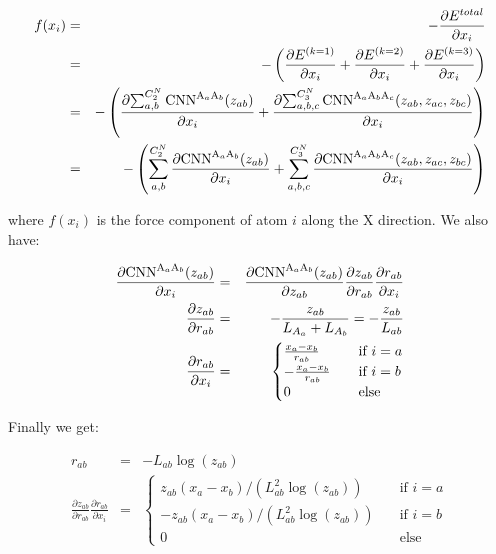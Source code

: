 \documentclass{article}
\begin{document}
\begin{eqnarray}
f(x_{i}) & = & -\frac{\partial{E^{total}}}{\partial{x_{i}}} \nonumber \\
& = & -\left(
	\frac{\partial{E^{(k=1)}}}{\partial{x_i}} 
	+ \frac{\partial{E^{(k=2)}}}{\partial{x_i}}
	+ \frac{\partial{E^{(k=3)}}}{\partial{x_i}} 
\right) \nonumber \\
& = & -\left(
\frac{
	\partial{\sum_{a,b}^{C^N_2}{
		\boldmath{\mathrm{CNN}}^{\mathrm{A}_{a}\mathrm{A}_{b}}}(z_{ab})}
	}{
		\partial{x_i}
	} 
+ 
\frac{
	\partial{\sum_{a,b,c}^{C^N_3}{
		\boldmath{\mathrm{CNN}}^{\mathrm{A}_{a}\mathrm{A}_{b}\mathrm{A}_{c}}}
		(z_{ab}, z_{ac}, z_{bc})}
	}{
		\partial{x_i}
	} 
\right) \nonumber \\
& = & -\left(
\sum_{a,b}^{C^N_2}{
	\frac{
		\partial{\boldmath{\mathrm{CNN}}^{\mathrm{A}_{a}\mathrm{A}_{b}}(z_{ab})}
	}{
		\partial{x_i}
	}
}
	+
\sum_{a,b,c}^{C^N_3}{
	\frac{
		\partial{\boldmath{\mathrm{CNN}}^{\mathrm{A}_{a}\mathrm{A}_{b}\mathrm{A}_{c}}
		(z_{ab}, z_{ac}, z_{bc})}
	}{
		\partial{x_i}
	}
}
\right)
\end{eqnarray}

\noindent where $f(x_{i})$ is the force component of atom $i$ along the X direction. We 
also have:

\begin{eqnarray}
%
%
\frac{
	\partial{\boldmath{\mathrm{CNN}}^{\mathrm{A}_{a}\mathrm{A}_{b}}(z_{ab})}
}{
	\partial{x_i}
} 
& = & 
\frac{\partial{
	\boldmath{\mathrm{CNN}}^{\mathrm{A}_{a}\mathrm{A}_{b}}(z_{ab})}
}{
	\partial{z_{ab}}
} \frac{\partial{z_{ab}}}{\partial{r_{ab}}} \frac{\partial{r_{ab}}}{\partial{x_i}} \\
%
%
\frac{ \partial{z_{ab}}}{\partial{r_{ab}}} 
& = & 
-\frac{z_{ab}}{L_{A_a} + L_{A_b}} = -\frac{z_{ab}}{L_{ab}} \\
%
%
\frac{\partial{r_{ab}}}{\partial{x_i}} & = & \begin{cases}
	\frac{x_a - x_b}{r_{ab}} & \quad \text{if } i = a \\
	-\frac{x_a - x_b}{r_{ab}} & \quad \text{if } i = b \\
	0                        & \quad \text{else}
\end{cases} 
\end{eqnarray}

\noindent Finally we get:

\begin{eqnarray}
r_{ab} & = & -L_{ab}\log{\left( z_{ab} \right)} \\
\frac{\partial{z_{ab}}}{\partial{r_{ab}}} \frac{\partial{r_{ab}}}{\partial{x_i}} 
& = &
\begin{cases}
z_{ab} (x_{a} - x_{b}) / (L_{ab}^{2} \log{(z_{ab})}) & \quad \text{if } i = a \\
-z_{ab} (x_{a} - x_{b}) / (L_{ab}^{2} \log{(z_{ab})}) & \quad \text{if } i = b \\
0 & \quad \text{else}
\end{cases}
\end{eqnarray}
\end{document}
